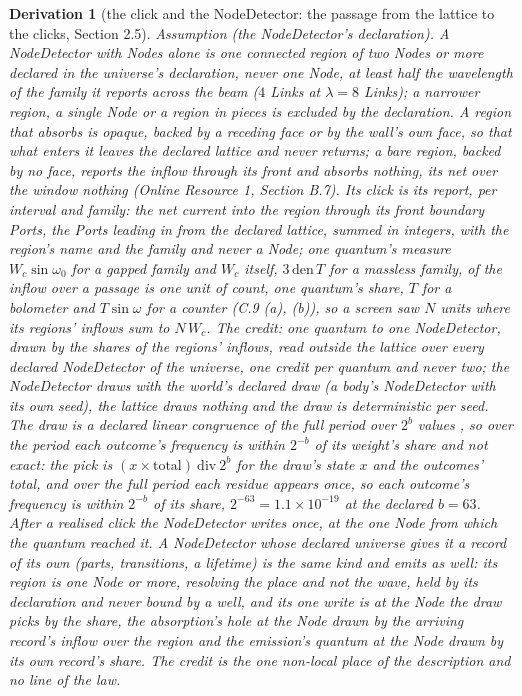 \documentclass[pdflatex,sn-mathphys-num]{sn-jnl}
\newcommand{\den}{\mathrm{den}}
\newcommand{\ddiv}{\ \mathrm{div}\ }
\newcommand{\Wc}{W_c}
\theoremstyle{thmstyleone}
\newtheorem{derivation}{Derivation}
\begin{document}
\begin{derivation}[the click and the NodeDetector: the passage from the lattice to the clicks, Section 2.5]
\emph{Assumption (the NodeDetector's declaration).} A NodeDetector with Nodes alone is one connected region of two Nodes or more declared in the universe's declaration, never one Node, at least half the wavelength of the family it reports across the beam ($4$ Links at $\lambda = 8$ Links); a narrower region, a single Node or a region in pieces is excluded by the declaration. A region that absorbs is opaque, backed by a receding face or by the wall's own face, so that what enters it leaves the declared lattice and never returns; a bare region, backed by no face, reports the inflow through its front and absorbs nothing, its net over the window nothing (Online Resource 1, Section B.7). Its click is its report, per interval and family: the net current into the region through its front boundary Ports, the Ports leading in from the declared lattice, summed in integers, with the region's name and the family and never a Node; one quantum's measure $W_c\sin\omega_0$ for a gapped family and $W_c$ itself, $3\,\den\,T$ for a massless family, of the inflow over a passage is one unit of count, one quantum's share, $T$ for a bolometer and $T\sin\omega$ for a counter (C.9 (a), (b)), so a screen saw $N$ units where its regions' inflows sum to $N\,\Wc$. The credit: one quantum to one NodeDetector, drawn by the shares of the regions' inflows, read outside the lattice over every declared NodeDetector of the universe, one credit per quantum and never two; the NodeDetector draws with the world's declared draw (a body's NodeDetector with its own seed), the lattice draws nothing and the draw is deterministic per seed. The draw is a declared linear congruence of the full period over $2^b$ values \cite{hull_dobell}, so over the period each outcome's frequency is within $2^{-b}$ of its weight's share and not exact: the pick is $(x \times \mathrm{total}) \ddiv 2^b$ for the draw's state $x$ and the outcomes' total, and over the full period each residue appears once, so each outcome's frequency is within $2^{-b}$ of its share, $2^{-63} = 1.1 \times 10^{-19}$ at the declared $b = 63$. After a realised click the NodeDetector writes once, at the one Node from which the quantum reached it. A NodeDetector whose declared universe gives it a record of its own (parts, transitions, a lifetime) is the same kind and emits as well: its region is one Node or more, resolving the place and not the wave, held by its declaration and never bound by a well, and its one write is at the Node the draw picks by the share, the absorption's hole at the Node drawn by the arriving record's inflow over the region and the emission's quantum at the Node drawn by its own record's share. The credit is the one non-local place of the description and no line of the law.



\end{derivation}
\end{document}
